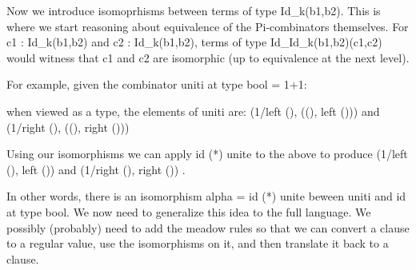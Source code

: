 \documentclass[preprint]{sigplanconf}
\begin{document}
Now we introduce isomoprhisms between terms of type {{Id_k(b1,b2)}}. This is
where we start reasoning about equivalence of the {{Pi}}-combinators
themselves. For {{c1 : Id_k(b1,b2)}} and {{c2 : Id_k(b1,b2)}}, terms of type
{{Id_{Id_k(b1,b2)}(c1,c2)}} would witness that {{c1}} and {{c2}} are
isomorphic (up to equivalence at the next level). 

For example, given the combinator {{uniti}} at type {{bool = 1+1}}:


when viewed as a type, the elements of {{uniti}} are:
{{ (1/left (), ((), left ())) }}
and 
{{ (1/right (), ((), right ())) }}

Using our isomorphisms we can apply {{ id (*) unite }} to the above to
produce
{{ (1/left (), left ()) }}
and 
{{ (1/right (), right ()) }}.

In other words, there is an isomorphism {{alpha = id (*) unite}} beween
{{uniti}} and {{id}} at type {{bool}}. We now need to generalize this idea to
the full language. We possibly (probably) need to add the meadow rules so
that we can convert a clause to a regular value, use the isomorphisms on it,
and then translate it back to a clause.

%
%

\end{document}
